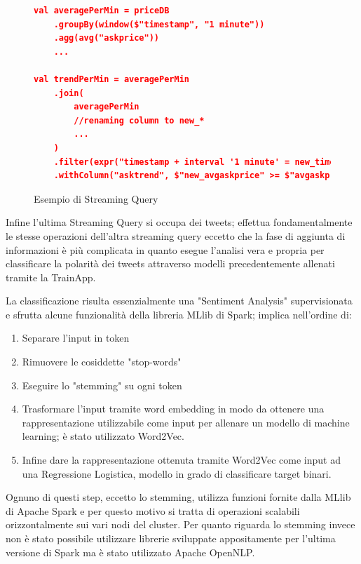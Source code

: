 \begin{figure}
    \begin{lstlisting}[language=json,firstnumber=1]
val averagePerMin = priceDB
    .groupBy(window($"timestamp", "1 minute"))
    .agg(avg("askprice"))
    ...

val trendPerMin = averagePerMin
    .join(
        averagePerMin
        //renaming column to new_*
        ...
    )
    .filter(expr("timestamp + interval '1 minute' = new_timestamp"))
    .withColumn("asktrend", $"new_avgaskprice" >= $"avgaskprice")
    \end{lstlisting}
    \caption{Esempio di Streaming Query}
    \label{trendpermin}
\end{figure}

Infine l'ultima Streaming Query si occupa dei tweets; effettua fondamentalmente le stesse operazioni
dell'altra streaming query eccetto che la fase di aggiunta di informazioni è più complicata in quanto
esegue l'analisi vera e propria per classificare la polarità dei tweets attraverso modelli
precedentemente allenati tramite la TrainApp.

La classificazione risulta essenzialmente una "Sentiment Analysis" supervisionata e sfrutta alcune
funzionalità della libreria MLlib di Spark; implica nell'ordine di:

\begin{enumerate}
    \item Separare l'input in token
    \item Rimuovere le cosiddette "stop-words"
    \item Eseguire lo "stemming" su ogni token
    \item Trasformare l'input tramite word embedding in modo da ottenere una rappresentazione
    utilizzabile come input per allenare un modello di machine learning; è stato utilizzato
    Word2Vec.
    \item Infine dare la rappresentazione ottenuta tramite Word2Vec come input ad una Regressione
    Logistica, modello in grado di classificare target binari.
\end{enumerate}

Ognuno di questi step, eccetto lo stemming, utilizza funzioni fornite dalla MLlib di Apache Spark
e per questo motivo si tratta di operazioni scalabili orizzontalmente sui vari nodi del cluster.
Per quanto riguarda lo stemming invece non è stato possibile utilizzare librerie sviluppate
appositamente per l'ultima versione di Spark ma è stato utilizzato Apache OpenNLP.


